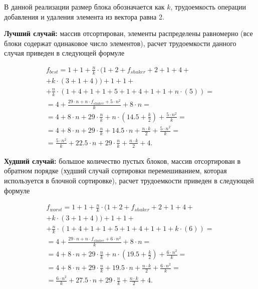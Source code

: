 В данной реализации размер блока обозначается как $k$, трудоемкость операции добавления и удаления элемента из вектора равна 2.


\textbf{Лучший случай:} массив отсортирован, элементы распределены равномерно (все блоки содержат одинаковое число элементов), расчет трудоемкости данного случая приведен в следующей формуле

\begin{equation}
	\label{сomplexity:block_best}
	\begin{gathered}
		f_{best} = 1 +1 + \frac{n}{k} \cdot(1 + 2+f_{shaker} + 2 + 1 + 4 + \\
		+ k \cdot (3 + 1 + 4)) + 1 + 1 + \\
		+ \frac{n}{k} \cdot (1 + 4 + 1 + 1 + 5 + 1 + 4 + 1 + 1 + n \cdot (5)) = \\
		= 4 + \frac{29\cdot n + n \cdot f_{shaker} + 5 \cdot n^2}{k}  + 8 \cdot n  = \\
		= 4 + 8 \cdot n + 29 \cdot \frac{n}{k} + n \cdot (14.5 + \frac{k}{2}) + \frac{5 \cdot n^2}{k} = \\
		= 4 + 8 \cdot n + 29 \cdot \frac{n}{k} + 14.5 \cdot n + \frac{n \cdot k}{2} + \frac{5 \cdot n^2}{k} = \\
		= \frac{5 \cdot n^2}{k} + 22.5 \cdot n + 29 \cdot \frac{n}{k} + \frac{n \cdot k}{2} + 4.
	\end{gathered}
\end{equation}

\textbf{Худший случай:} большое количество пустых блоков, массив отсортирован в обратном порядке (худший случай сортировки перемешиванием, которая используется в блочной сортировке), расчет трудоемкости приведен в следующей формуле

\begin{equation}
	\label{сomplexity:block_worst}
	\begin{gathered}
		f_{worst} = 1 +1 + \frac{n}{k} \cdot(1 + 2+f_{shaker} + 2 + 1 + 4 + \\
		+ k \cdot (3 + 1 + 4)) + 1 + 1 + \\
		 + \frac{n}{k} \cdot (1 + 4 + 1 + 1 + 5 + 1 + 4 + 1 + 1 + k \cdot (6)) = \\
		= 4 + \frac{29\cdot n + n \cdot f_{shaker} + 6 \cdot n^2}{k}  + 8 \cdot n  = \\
		= 4 + 8 \cdot n + 29 \cdot \frac{n}{k} + n \cdot (19.5 + \frac{k}{2}) + \frac{6 \cdot n^2}{k} = \\
		= 4 + 8 \cdot n + 29 \cdot \frac{n}{k} + 19.5 \cdot n + \frac{n \cdot k}{2} + \frac{6 \cdot n^2}{k} = \\
		= \frac{6 \cdot n^2}{k} + 27.5 \cdot n + 29 \cdot \frac{n}{k} + \frac{n \cdot k}{2} + 4.
	\end{gathered}
\end{equation}


